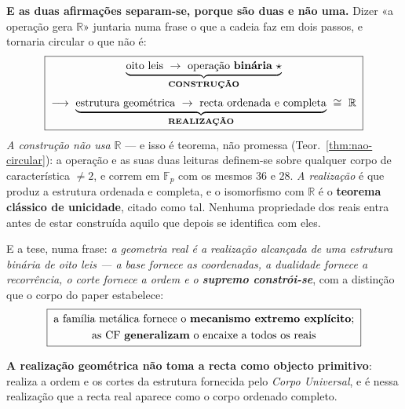 \documentclass[11pt,a4paper]{article}
\begin{document}
\medskip
\noindent\textbf{E as duas afirmações separam-se, porque são duas e não uma.} Dizer «a
operação gera $\mathbb{R}$» juntaria numa frase o que a cadeia faz em dois passos, e
tornaria circular o que não é:
\[
\boxed{\;\begin{gathered}
\underbrace{\text{oito leis}\ \to\ \text{operação \textbf{binária}}\ \star}
_{\textbf{CONSTRUÇÃO}}\\[3pt]
\longrightarrow\
\underbrace{\text{estrutura geométrica}\ \to\ \text{recta ordenada e completa}}
_{\textbf{REALIZAÇÃO}}
\ \cong\ \mathbb{R}
\end{gathered}\;}
\]
\emph{A construção não usa $\mathbb{R}$} --- e isso é teorema, não promessa
(Teor.~\ref{thm:nao-circular}): a operação e as suas duas leituras definem-se sobre
qualquer corpo de característica $\neq2$, e correm em $\mathbb{F}_p$ com os mesmos $36$
e $28$. \emph{A realização} é que produz a estrutura ordenada e completa, e o
isomorfismo com $\mathbb{R}$ é o \textbf{teorema clássico de unicidade}, citado como
tal. Nenhuma propriedade dos reais entra antes de estar construída aquilo que depois se
identifica com eles.

\medskip
\noindent E a tese, numa frase: \emph{a geometria real é a realização alcançada de
uma estrutura binária de oito leis --- a base fornece as coordenadas, a dualidade
fornece a recorrência, o corte fornece a ordem e o \textbf{supremo constrói-se}},
com a distinção que o corpo do paper estabelece:
\[
\boxed{\;\begin{gathered}
\text{a família metálica fornece o \textbf{mecanismo extremo explícito};}\\
\text{as CF \textbf{generalizam} o encaixe a todos os reais}
\end{gathered}\;}
\]

\smallskip
\noindent\textbf{A realização geométrica não toma a recta como objecto
primitivo}: realiza a ordem e os cortes da estrutura fornecida pelo \emph{Corpo
Universal}, e é nessa realização que a recta real aparece como o corpo ordenado
completo.
\end{document}
